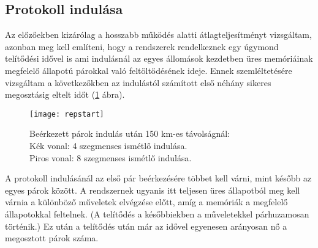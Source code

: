 \subsection{Protokoll indulása}
Az előzőekben kizárólag a hosszabb működés alatti átlagteljesítményt vizsgáltam, azonban meg kell említeni, hogy a rendszerek rendelkeznek egy úgymond telítődési idővel is ami indulásnál az egyes állomások kezdetben üres memóriáinak megfelelő állapotú párokkal való feltöltődésének ideje. Ennek szemléltetésére vizsgáltam a következőkben az indulástól számított első néhány sikeres megosztásig eltelt időt (\ref{fig:start} ábra).
\begin{figure}[H]
\centering
\texttt{[image: repstart]}
\caption[Beérkezett párok indulás után]
{Beérkezett párok indulás után 150 km-es távolságnál:\\
Kék vonal: 4 szegmenses ismétlő indulása.\\
Piros vonal: 8 szegmenses  ismétlő indulása.
}
\label{fig:start}
\end{figure}
A protokoll indulásánál az első pár beérkezésére többet kell várni, mint később az egyes párok között. A rendszernek ugyanis itt teljesen üres állapotból meg kell várnia a különböző műveletek elvégzése előtt, amíg a memóriák a megfelelő állapotokkal feltelnek. (A telítődés a későbbiekben a műveletekkel párhuzamosan történik.) Ez után a telítődés után már az idővel egyenesen arányosan nő a megosztott párok száma.
